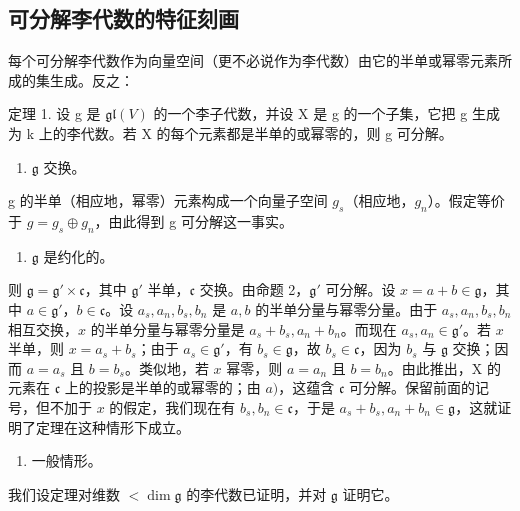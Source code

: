 \subsection{可分解李代数的特征刻画}

每个可分解李代数作为向量空间（更不必说作为李代数）由它的半单或幂零元素所成的集生成。反之：

定理 1. 设 g 是 \(\mathfrak{gl}(V)\) 的一个李子代数，并设 X 是 g 的一个子集，它把 g 生成为 k 上的李代数。若 X 的每个元素都是半单的或幂零的，则 g 可分解。

\begin{enumerate}
\def\labelenumi{\alph{enumi})}
\tightlist
\item
  \(\mathfrak{g}\) 交换。
\end{enumerate}

g 的半单（相应地，幂零）元素构成一个向量子空间 \(g_{s}\)（相应地，\(g_{n}\)）。假定等价于 \(g = g_{s} \oplus g_{n}\)，由此得到 g 可分解这一事实。

\begin{enumerate}
\def\labelenumi{\alph{enumi})}
\setcounter{enumi}{1}
\tightlist
\item
  \(\mathfrak{g}\) 是约化的。
\end{enumerate}

则 \(\mathfrak{g} = \mathfrak{g}' \times \mathfrak{c}\)，其中 \(\mathfrak{g}'\) 半单，\(\mathfrak{c}\) 交换。由命题 2，\(\mathfrak{g}'\) 可分解。设 \(x = a + b \in \mathfrak{g}\)，其中 \(a \in \mathfrak{g}'\)，\(b \in \mathfrak{c}\)。设 \(a_s, a_n, b_s, b_n\) 是 \(a, b\) 的半单分量与幂零分量。由于 \(a_s, a_n, b_s, b_n\) 相互交换，\(x\) 的半单分量与幂零分量是 \(a_s + b_s, a_n + b_n\)。而现在 \(a_s, a_n \in \mathfrak{g}'\)。若 \(x\) 半单，则 \(x = a_s + b_s\)；由于 \(a_s \in \mathfrak{g}'\)，有 \(b_s \in \mathfrak{g}\)，故 \(b_s \in \mathfrak{c}\)，因为 \(b_s\) 与 \(\mathfrak{g}\) 交换；因而 \(a = a_s\) 且 \(b = b_s\)。类似地，若 \(x\) 幂零，则 \(a = a_n\) 且 \(b = b_n\)。由此推出，X 的元素在 \(\mathfrak{c}\) 上的投影是半单的或幂零的；由 \(a)\)，这蕴含 \(\mathfrak{c}\) 可分解。保留前面的记号，但不加于 \(x\) 的假定，我们现在有 \(b_s, b_n \in \mathfrak{c}\)，于是 \(a_s + b_s, a_n + b_n \in \mathfrak{g}\)，这就证明了定理在这种情形下成立。

\begin{enumerate}
\def\labelenumi{\alph{enumi})}
\setcounter{enumi}{2}
\tightlist
\item
  一般情形。
\end{enumerate}

我们设定理对维数 \(< \dim \mathfrak{g}\) 的李代数已证明，并对 \(\mathfrak{g}\) 证明它。

